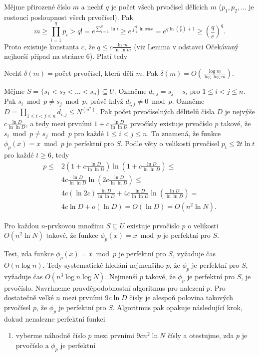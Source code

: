 \documentclass[a4paper,12pt]{article}
\begin{document}
Mějme přirozené číslo $m$ a nechť $q$ je počet všech prvočísel 
dělících $m$ ($p_1,p_2,\dots$ je rostoucí posloupnost všech 
prvočísel). Pak
$$m\ge\prod_{i=1}^qp_i>q!=e^{\sum_{i=1}^q\ln i}\ge e^{\int_1^q\ln 
xdx}=e^{q\ln(\frac qe)+1}\ge (\frac qe)^q.$$
Proto existuje konstanta $c$, že $q\le c\frac {\ln m}{\ln\ln m}$ (viz Lemma v odstavci Očekávaný 
nejhorší případ na stránce 6). Platí tedy  
\begin{veta}Nechť $\delta (m)=$počet prvočísel, která dělí 
$m$. Pak $\delta (m)=O(\frac {\log m}{\log\log m})$.
\end{veta}

Mějme $S=\{s_1<s_2<\dots<s_n\}\subseteq U$. Označme 
$d_{i,j}=s_j-s_i$ pro $1\le i<j\le n$. Pak $s_i\bmod p\ne s_j\bmod 
p$, 
právě když $d_{i,j}\ne 0\bmod p$. Označme 
$D=\prod_{1\le i<j\le n}d_{i,j}\le N^{(n^2)}$. Pak počet prvočíselných 
dělitelů čísla $D$ je nejvýše $c\frac {\ln 
D}{\ln\ln D}$, a tedy mezi 
prvními $1+c\frac {\ln D}{\ln\ln D}$ prvočísly existuje prvočíslo $
p$ 
takové, že $s_i\bmod p\ne s_j\bmod p$ pro každé $1\le i
<j\le n$. 
To znamená, že funkce $\phi_p(x)=x\bmod p$ je perfektní pro 
$S$. Podle věty o velikosti prvočísel $p_t\le 2t\ln t$ pro každé $
t\ge 6$, tedy
\begin{align*} p\le&2(1+c\frac {\ln D}{\ln\ln D})\ln(1+c\frac {\ln D}{\ln\ln 
D})\le\\
&4c\frac {\ln D}{\ln\ln D}\ln(2c\frac {\ln D}{\ln\ln D})\le\\
&4c(\ln2c)\frac {\ln D}{\ln\ln D}+4c\frac {\ln D}{\ln\ln D}\ln(\frac {\ln 
D}{\ln\ln D})=\\
&4c\ln D+o(\ln D)=O(\ln D)=O(n^2\ln N).\end{align*}

\begin{veta}Pro každou $n$-prvkovou množinu $S\subseteq 
U$ 
existuje prvo\-čís\-lo $p$ o velikosti $O(n^2\ln N)$ takové, že 
funkce $\phi_p(x)=x\bmod p$ je perfektní pro $S$.  
\end{veta}

Test, zda funkce $\phi_p(x)=x\bmod p$ je perfektní 
pro $S$, 
vyžaduje čas $O(n\log n)$. Tedy systematické hledání 
nejmenšího $p$, že $\phi_p$ je perfektní pro $S$, vyžaduje čas 
$O(n^3\log n\log N)$. Nejmenší $p$ takové, že $\phi_p$ je perfektní 
pro $S$, 
je prvočíslo. Navrhneme pravděpodob\-nostní algoritmus 
pro nalezení $p$. Pro dostatečně velké $n$ mezi 
prvními $9c\ln D$ čísly je alespoň polovina tako\-vých 
prvočísel $p$, že $\phi_p$ je perfektní pro $S$. Algoritmus pak 
opakuje následující krok, dokud nenalezne perfektní funkci
\begin{enumerate}
\item 
vyberme náhodně číslo $p$ mezi prvními $9cn^2\ln 
N$ 
čísly a otestujme, zda $p$ je prvočíslo a $\phi_p$ je perfektní
\end{enumerate}
\end{document}

